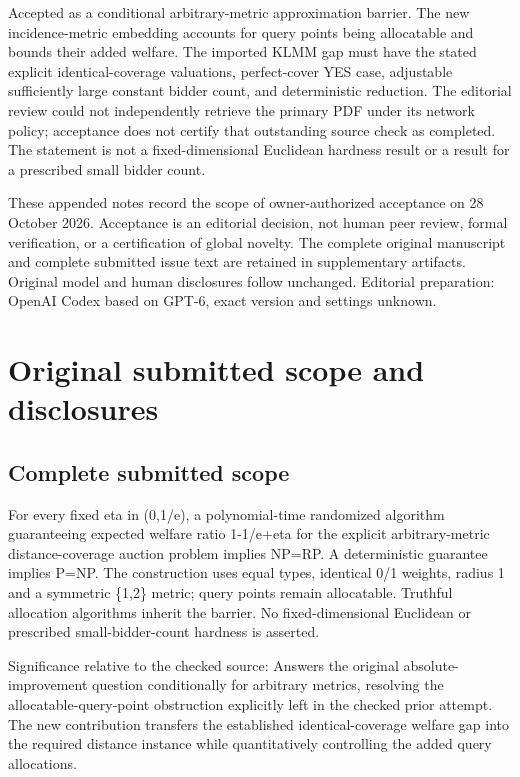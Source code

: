 \documentclass[11pt]{article}
\begin{document}
Accepted as a conditional arbitrary-metric approximation barrier. The new incidence-metric embedding accounts for query points being allocatable and bounds their added welfare. The imported KLMM gap must have the stated explicit identical-coverage valuations, perfect-cover YES case, adjustable sufficiently large constant bidder count, and deterministic reduction. The editorial review could not independently retrieve the primary PDF under its network policy; acceptance does not certify that outstanding source check as completed. The statement is not a fixed-dimensional Euclidean hardness result or a result for a prescribed small bidder count.

These appended notes record the scope of owner-authorized acceptance on 28 October 2026. Acceptance is an editorial decision, not human peer review, formal verification, or a certification of global novelty. The complete original manuscript and complete submitted issue text are retained in supplementary artifacts. Original model and human disclosures follow unchanged. Editorial preparation: OpenAI Codex based on GPT-6, exact version and settings unknown.

\section{Original submitted scope and disclosures}

\subsection{Complete submitted scope}

For every fixed eta in (0,1/e), a polynomial-time randomized algorithm guaranteeing expected welfare ratio 1-1/e+eta for the explicit arbitrary-metric distance-coverage auction problem implies NP=RP. A deterministic guarantee implies P=NP. The construction uses equal types, identical 0/1 weights, radius 1 and a symmetric \{1,2\} metric; query points remain allocatable. Truthful allocation algorithms inherit the barrier. No fixed-dimensional Euclidean or prescribed small-bidder-count hardness is asserted.

Significance relative to the checked source: Answers the original absolute-improvement question conditionally for arbitrary metrics, resolving the allocatable-query-point obstruction explicitly left in the checked prior attempt. The new contribution transfers the established identical-coverage welfare gap into the required distance instance while quantitatively controlling the added query allocations.
\end{document}
